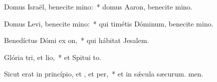 \item Domus Israël, benecite mino:~* domus Aaron, benecite mino.
\item Domus Levi, benecite mino:~* qui timétis Dóminum, benecite mino.
\item Benedíctus Dómi ex on,~* qui hábitat  Jesalem.
\item Glória tri, et lio,~* et Spitui to.
\item Sicut erat in princípio, et , et per,~* et in sǽcula sæcurum. men.
